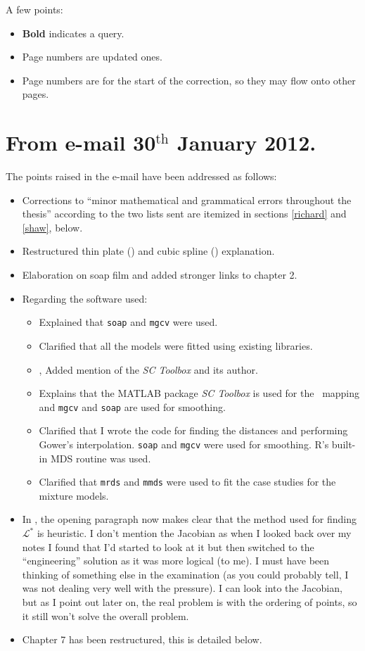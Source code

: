 
A few points:
\begin{itemize}
	\item \textbf{Bold} indicates a query.
	\item Page numbers are updated ones.
	\item Page numbers are for the start of the correction, so they may flow onto other pages.
\end{itemize}


\section{From e-mail 30$^\text{th}$ January 2012.}

The points raised in the e-mail have been addressed as follows:
\begin{itemize}
\item Corrections to ``minor mathematical and grammatical errors throughout the thesis'' according to the two lists sent are itemized in sections \ref{richard} and \ref{shaw}, below.
\item Restructured thin plate () and cubic spline () explanation.
\item Elaboration on soap film and added stronger links to chapter 2.
\item Regarding the software used:
\begin{itemize}
	\item {} Explained that \texttt{soap} and \texttt{mgcv} were used.
	\item {} Clarified that all the models were fitted using existing libraries.
	\item {},  Added mention of the \textit{SC Toolbox} and its author.
	\item {} Explains that the MATLAB package \textit{SC Toolbox} is used for the \sch\ mapping and \texttt{mgcv} and \texttt{soap} are used for smoothing.
	\item {} Clarified that I wrote the code for finding the distances and performing Gower's interpolation. \texttt{soap} and \texttt{mgcv} were used for smoothing. \textsf{R}'s built-in MDS routine was used.
	\item {} Clarified that \texttt{mrds} and \texttt{mmds} were used to fit the case studies for the mixture models.
\end{itemize}
\item In , the opening paragraph now makes clear that the method used for finding $\mathcal{L}^*$ is heuristic. I don't mention the Jacobian as when I looked back over my notes I found that I'd started to look at it but then switched to the ``engineering'' solution as it was more logical (to me). I must have been thinking of something else in the examination (as you could probably tell, I was not dealing very well with the pressure). I can look into the Jacobian, but as I point out later on, the real problem is with the ordering of points, so it still won't solve the overall problem.
\item Chapter 7 has been restructured, this is detailed below.
\end{itemize}


